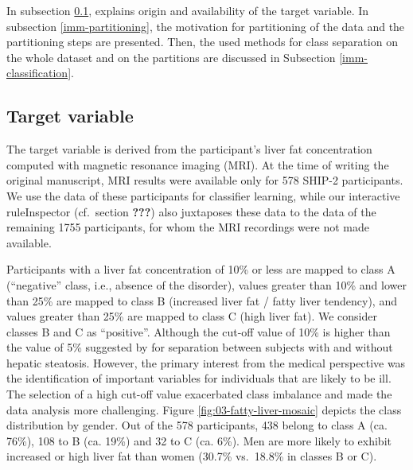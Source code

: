 \documentclass[
  oneside]{book}
\begin{document}
In subsection \ref{imm-target}, explains origin and availability of the target variable.
In subsection \ref{imm-partitioning}, the motivation for partitioning of the data and the partitioning steps are presented.
Then, the used methods for class separation on the whole dataset and on the partitions are discussed in Subsection \ref{imm-classification}.

\hypertarget{imm-target}{%
\subsection{Target variable}\label{imm-target}}

The target variable is derived from the participant's liver fat concentration computed with magnetic resonance imaging (MRI).
At the time of writing the original manuscript, MRI results were available only for 578 SHIP-2 participants.
We use the data of these participants for classifier learning, while our interactive ruleInspector (cf.~section \textbf{???}) also juxtaposes these data to the data of the remaining 1755 participants, for whom the MRI recordings were not made available.

Participants with a liver fat concentration of 10\% or less are mapped to class A (``negative'' class, i.e., absence of the disorder), values greater than 10\% and lower than 25\% are mapped to class B (increased liver fat / fatty liver tendency), and values greater than 25\% are mapped to class C (high liver fat).
We consider classes B and C as ``positive''.
Although the cut-off value of 10\% is higher than the value of 5\% suggested by \autocite{KuehnEtAl:2011} for separation between subjects with and without hepatic steatosis.
However, the primary interest from the medical perspective was the identification of important variables for individuals that are likely to be ill.~
The selection of a high cut-off value exacerbated class imbalance and made the data analysis more challenging. Figure \ref{fig:03-fatty-liver-mosaic} depicts the class distribution by gender.
Out of the 578 participants, 438 belong to class A (ca. 76\%), 108 to B (ca. 19\%) and 32 to C (ca. 6\%).
Men are more likely to exhibit increased or high liver fat than women (30.7\% vs.~18.8\% in classes B or C).
\end{document}
